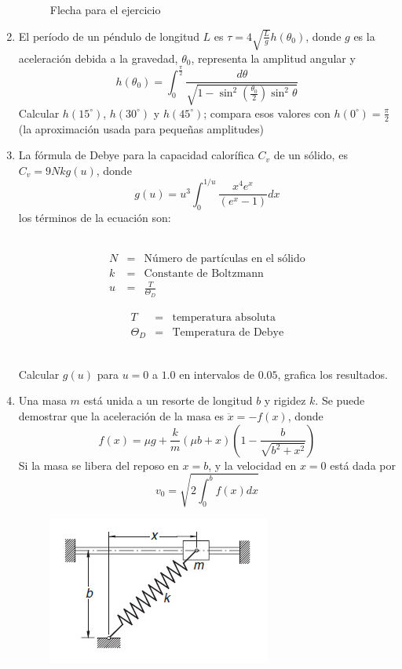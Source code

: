\documentclass[11pt]{article}
\begin{document}
\begin{enumerate}
\begin{figure}[H]
	\caption{Flecha para el ejercicio}
\end{figure}
\item El período de un péndulo de longitud $L$ es $\tau = 4 \sqrt{\frac{L}{g}} h(\theta_{0})$, donde $g$ es la aceleración debida a la gravedad, $\theta_{0}$, representa la amplitud angular y 
\[ h(\theta_{0}) =  \int_{0}^{\frac{\pi}{2}} \dfrac{d\theta}{\sqrt{1 - \sin^{2} \left( \frac{\theta_{0}}{2}\right) \sin^{2} \theta}} \]
Calcular $h(15^{\circ})$, $h(30^{\circ})$ y $h(45^{\circ})$; compara esos valores con $h(0^{\circ}) = \frac{\pi}{2}$ (la aproximación usada para pequeñas amplitudes)
\item La fórmula de Debye para la capacidad calorífica $C_{v}$ de un sólido, es $C_{v} = 9 Nkg(u)$, donde
\[g(u) = u^{3} \int_{0}^{1/u} \dfrac{x^{4}e^{x}}{(e^{x}-1)}dx\]
los términos de la ecuación son:
\\
\\
\begin{minipage}{4cm}
\begin{eqnarray*}
N &=& \text{Número de partículas en el sólido} \\
k &=& \text{Constante de Boltzmann} \\
u &=& \frac{T}{\Theta_{D}}
\end{eqnarray*}
\end{minipage}
\hspace{3cm}
\begin{minipage}{4cm}
\begin{eqnarray*}
T &=& \text{temperatura absoluta} \\
\Theta_{D} &=& \text{Temperatura de Debye}
\end{eqnarray*}
\end{minipage}
\\
Calcular $g(u)$ para $u=0$ a $1.0$ en intervalos de $0.05$, grafica los resultados.
\item Una masa $m$ est\'{a} unida a un resorte de longitud $b$ y rigidez $k$. Se puede demostrar que la aceleración de la masa es $\ddot{x} = -f(x)$, donde
\[f(x) = \mu g + \dfrac{k}{m} (\mu b + x) \left( 1 - \dfrac{b}{\sqrt{b^{2} + x^{2}}} \right)\]
Si la masa se libera del reposo en $x=b$, y la velocidad en $x=0$ est\'{a} dada por
\[ v_{0} = \sqrt{2 \int_{0}^{b} f(x) dx}\]
\begin{figure}[H]
	\centering
	\includegraphics[scale=0.5]{Imagenes/Integral_02_Resorte.jpg}

\end{figure}
\end{enumerate}
\end{document}
